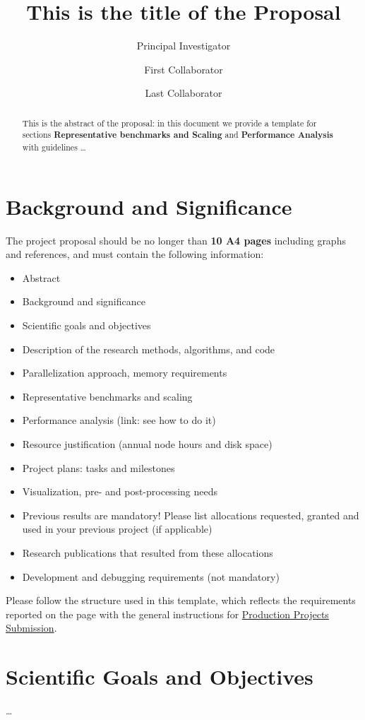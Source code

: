 \documentclass[11pt]{article}
\title{This is the title of the Proposal}
\author[1]{Principal Investigator}
\author[2]{First Collaborator}
\author[1,2]{Last Collaborator}
\affil[1]{PI affiliation}
\affil[2]{Other affiliation}
\date{}
\begin{document}
\maketitle

\begin{abstract}
 This is the abstract of the proposal: in this document we provide a template for sections 
\textbf{Representative benchmarks and Scaling} and \textbf{Performance Analysis} with guidelines \ldots
\end{abstract}

\section{Background and Significance}
The project proposal should be no longer than \textbf{10 A4 pages} including graphs and references, and must contain the following information:
\begin{itemize}
 \item Abstract
 \item Background and significance
 \item Scientific goals and objectives
 \item Description of the research methods, algorithms, and code
 \item Parallelization approach, memory requirements
 \item Representative benchmarks and scaling
 \item Performance analysis (link: see how to do it)
 \item Resource justification (annual node hours and disk space)
 \item Project plans: tasks and milestones
 \item Visualization, pre- and post-processing needs
 \item Previous results are mandatory! Please list allocations requested, granted and used in your previous project (if applicable)
 \item Research publications that resulted from these allocations
 \item Development and debugging requirements (not mandatory)
\end{itemize}
Please follow the structure used in this template, which reflects the requirements reported on the page with the general instructions for \href{http://www.cscs.ch/user_lab/allocation_schemes/submission100/index.html}{Production Projects Submission}. 

\section{Scientific Goals and Objectives}
\ldots 
\end{document}
